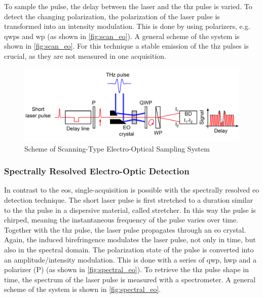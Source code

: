 To sample the pulse, the delay between the laser and the \gls{thz} pulse is varied.
To detect the changing polarization, the polarization of the laser pulse is transformed into an intensity modulation. This is done by using polarizers, e.g. \glspl{qwp} and \gls{wp} (as shown in \autoref{fig:scan_eo}).
A general scheme of the system is shown in \autoref{fig:scan_eo}.
For this technique a stable emission of the \gls{thz} pulses is crucial, as they are not measured in one acquisition. \cite{roussel2014}
\begin{figure}[tb]
	\centering
	\includegraphics[width = \textwidth]{chap/02-theory/img/bd/scanning_eo}
	\caption{Scheme of Scanning-Type Electro-Optical Sampling System \cite{roussel2014}}
	\label{fig:scan_eo}
\end{figure}


\subsubsection*{Spectrally Resolved Electro-Optic Detection}
In contrast to the \gls{eos}, single-acquisition is possible with the spectrally resolved \gls{eo} detection technique.
The short laser pulse is first stretched to a duration similar to the \gls{thz} pulse in a dispersive material, called stretcher.
In this way the pulse is chirped, meaning the instantaneous frequency of the pulse varies over time.
Together with the \gls{thz} pulse, the laser pulse propagates through an \gls{eo} crystal.
Again, the induced birefringence modulates the laser pulse, not only in time, but also in the spectral domain. %
The polarization state of the pulse is converted into an amplitude/intensity modulation.
This is done with a series of \gls{qwp}, \gls{hwp} and a polarizer (P) (as shown in \autoref{fig:spectral_eo}).
To retrieve the \gls{thz} pulse shape in time, the spectrum of the laser pulse is measured with a spectrometer. %
A general scheme of the system is shown in \autoref{fig:spectral_eo}. \cite{roussel2014}

